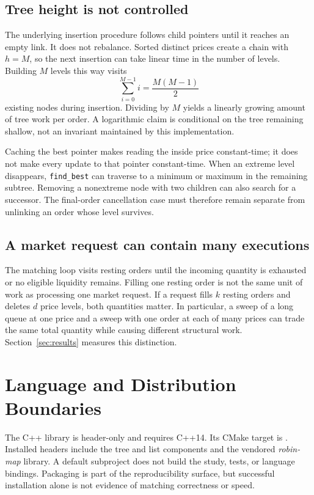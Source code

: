 \documentclass[10pt,letterpaper,twocolumn]{article}
\newcommand{\code}[1]{\texttt{#1}}
\begin{document}
\subsection{Tree height is not controlled}
The underlying insertion procedure follows child pointers until it reaches
an empty link. It does not rebalance. Sorted distinct prices create a chain
with $h=M$, so the next insertion can take linear time in the number of
levels. Building $M$ levels this way visits
\begin{equation}
 \sum_{i=0}^{M-1}i=\frac{M(M-1)}{2}
\end{equation}
existing nodes during insertion. Dividing by $M$ yields a linearly growing
amount of tree work per order. A logarithmic claim is conditional on the
tree remaining shallow, not an invariant maintained by this implementation.

Caching the best pointer makes reading the inside price constant-time; it
does not make every update to that pointer constant-time. When an extreme
level disappears, \code{find\_best} can traverse to a minimum or maximum in
the remaining subtree. Removing a nonextreme node with two children can also
search for a successor. The final-order cancellation case must therefore
remain separate from unlinking an order whose level survives.

\subsection{A market request can contain many executions}
The matching loop visits resting orders until the incoming quantity is
exhausted or no eligible liquidity remains. Filling one resting order is not
the same unit of work as processing one market request. If a request fills
$k$ resting orders and deletes $d$ price levels, both quantities matter.
In particular, a sweep of a long queue at one price and a sweep with one
order at each of many prices can trade the same total quantity while causing
different structural work. Section~\ref{sec:results} measures this distinction.

\section{Language and Distribution Boundaries}
The C++ library is header-only and requires C++14. Its CMake target is
. Installed headers include the
tree and list components and the vendored \emph{robin-map} library.
A default subproject does not build the
study, tests, or language bindings. Packaging is part of the reproducibility
surface, but successful installation alone is not evidence of matching
correctness or speed.
\end{document}
